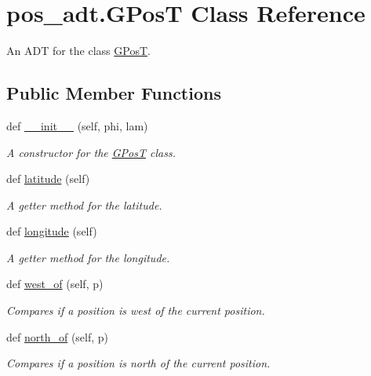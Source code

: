 \hypertarget{classpos__adt_1_1_g_pos_t}{}\section{pos\+\_\+adt.\+G\+PosT Class Reference}
\label{classpos__adt_1_1_g_pos_t}


An A\+DT for the class \hyperlink{classpos__adt_1_1_g_pos_t}{G\+PosT}.  


\subsection*{Public Member Functions}
\begin{DoxyCompactItemize}
\item 
def \hyperlink{classpos__adt_1_1_g_pos_t_afedced57a1fc21337f8b67b5cf22b3bd}{\+\_\+\+\_\+init\+\_\+\+\_\+} (self, phi, lam)
\begin{DoxyCompactList}\small\item\em A constructor for the \hyperlink{classpos__adt_1_1_g_pos_t}{G\+PosT} class. \end{DoxyCompactList}\item 
def \hyperlink{classpos__adt_1_1_g_pos_t_a5e33788ed4070f65c646eb7269f29eff}{latitude} (self)
\begin{DoxyCompactList}\small\item\em A getter method for the latitude. \end{DoxyCompactList}\item 
def \hyperlink{classpos__adt_1_1_g_pos_t_a7af546bfe3e2decc2e82105ab479e179}{longitude} (self)
\begin{DoxyCompactList}\small\item\em A getter method for the longitude. \end{DoxyCompactList}\item 
def \hyperlink{classpos__adt_1_1_g_pos_t_a89baaed8a97b6b3eeba5aeea866c888e}{west\+\_\+of} (self, p)
\begin{DoxyCompactList}\small\item\em Compares if a position is west of the current position. \end{DoxyCompactList}\item 
def \hyperlink{classpos__adt_1_1_g_pos_t_adb5cfeefc3c133895289d3507e7a14f7}{north\+\_\+of} (self, p)
\begin{DoxyCompactList}\small\item\em Compares if a position is north of the current position. \end{DoxyCompactList}\item 

\end{DoxyCompactItemize}
